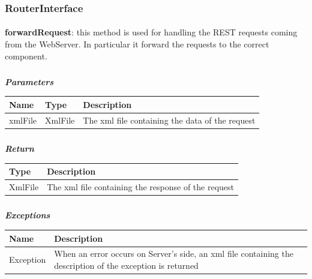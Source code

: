 				\subsubsection{RouterInterface}
					\paragraph{}
							\textbf{forwardRequest}: this method is used for handling the REST requests coming from the WebServer. In particular it forward the requests to the correct component.
							\subparagraph{}
							\vspace{-3mm}
							\textcolor{myBlue}{\textit{\textbf{Parameters}}}
							\vspace{-2mm}
								\begin{table}[!h]
									\begin{tabular}{L{0.15\textwidth}L{0.15\textwidth}L{0.58\textwidth}}
										\toprule
										\textbf{Name} & \textbf{Type} & \textbf{Description} \\
										\midrule
								  		xmlFile & XmlFile & The xml file containing the data of the request  \\
								 		\bottomrule
									\end{tabular}
								\end{table}
							\subparagraph{}
							\vspace{-6mm}
								\textcolor{myGreen}{\textit{\textbf{Return}}}
								\vspace{-2mm}
									\begin{table}[!h]
									\begin{tabular}{L{0.15\textwidth}L{0.77\textwidth}}
										\toprule
										\textbf{Type} & \textbf{Description} \\
										\midrule
								  		XmlFile & The xml file containing the response of the request \\
								 		\bottomrule
									\end{tabular}
								\end{table}
							\subparagraph{}
							\vspace{-6mm}
								\textcolor{myRed}{\textit{\textbf{Exceptions}}}
								\vspace{-2mm}
									\begin{table}[!h]
									\begin{tabular}{L{0.2\textwidth}L{0.72\textwidth}}
										\toprule
										\textbf{Name} & \textbf{Description} \\
										\midrule
								  		Exception & When an error occurs on Server's side, an xml file containing the description of the exception is returned \\
								 		\bottomrule
									\end{tabular}
								\end{table}
				\clearpage	
